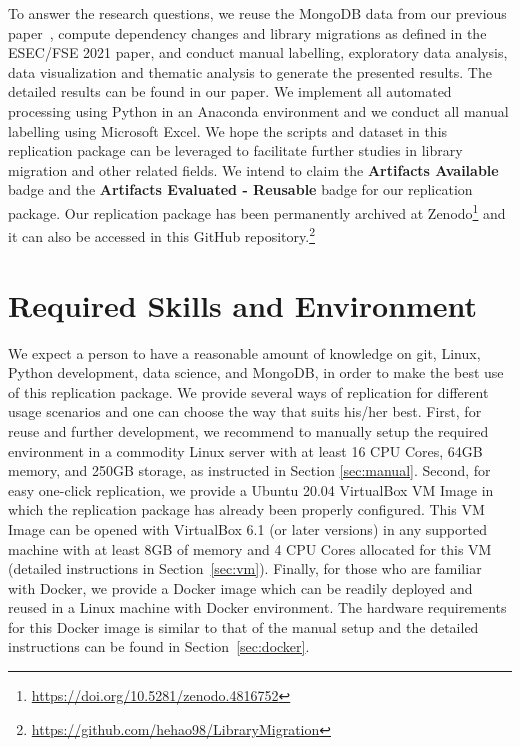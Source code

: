 \documentclass[sigconf]{acmart}
\begin{document}
To answer the research questions, we reuse the MongoDB data from our previous paper~\cite{he2021multi}, compute dependency changes and library migrations as defined in the ESEC/FSE 2021 paper, and conduct manual labelling, exploratory data analysis, data visualization and thematic analysis to generate the presented results.
The detailed results can be found in our paper.
We implement all automated processing using Python in an Anaconda environment and we conduct all manual labelling using Microsoft Excel.
We hope the scripts and dataset in this replication package can be leveraged to facilitate further studies in library migration and other related fields. 
We intend to claim the \textbf{Artifacts Available} badge and the \textbf{Artifacts Evaluated - Reusable} badge for our replication package. 
Our replication package has been permanently archived at Zenodo\footnote{\url{https://doi.org/10.5281/zenodo.4816752}} and it can also be accessed in this GitHub repository.\footnote{\url{https://github.com/hehao98/LibraryMigration}}

\section{Required Skills and Environment}
\label{sec:skill-env}

We expect a person to have a reasonable amount of knowledge on git, Linux, Python development, data science, and MongoDB, in order to make the best use of this replication package.
We provide several ways of replication for different usage scenarios and one can choose the way that suits his/her best.
First, for reuse and further development, we recommend to manually setup the required environment in a commodity Linux server with at least 16 CPU Cores, 64GB memory, and 250GB storage, as instructed in Section \ref{sec:manual}.
Second, for easy one-click replication, we provide a Ubuntu 20.04 VirtualBox VM Image in which the replication package has already been properly configured.
This VM Image can be opened with VirtualBox 6.1 (or later versions) in any supported machine with at least 8GB of memory and 4 CPU Cores allocated for this VM (detailed instructions in Section~\ref{sec:vm}).
Finally, for those who are familiar with Docker, we provide a Docker image which can be readily deployed and reused in a Linux machine with Docker environment.
The hardware requirements for this Docker image is similar to that of the manual setup and the detailed instructions can be found in Section~\ref{sec:docker}.
\end{document}

